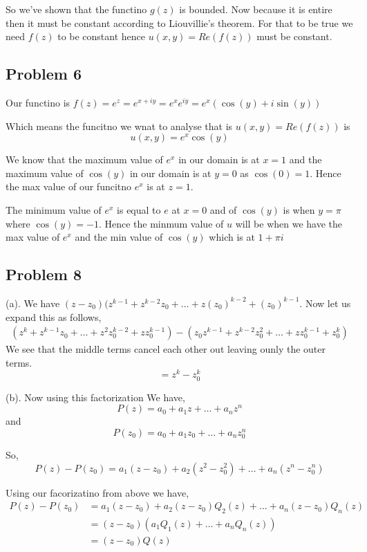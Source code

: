 \documentclass[a4paper]{report}
\begin{document}
So we've shown that the functino $g(z)$ is bounded. Now because it is entire then it must be constant according to Liouvillie's theorem. For that to be true we need $f(z)$ to be constant hence $u(x,y) = Re(f(z))$  must be constant.

\subsection*{Problem 6}


Our functino is $f(z) = e^{z} = e^{x + iy} = e^{x}e^{iy} = e^{x}(\cos(y) + i \sin(y))$ 

Which means the funcitno we wnat to analyse that is $u(x,y) = Re(f(z))$ is  
$$ u(x,y) = e^{x}\cos(y)$$

We know that the maximum value of $e^{x}$ in our domain is at $x = 1$ and the maximum value of $\cos(y)$ in our domain is at $y = 0$ as $\cos(0) = 1$. Hence the max value of our funcitno $e^{x}$ is at $z = 1$. 

The minimum value of  $e^{x}$ is equal to $e$ at  $x = 0$  and of $\cos(y)$  is when $y = \pi$ where  $\cos(y) = -1$. Hence the minmum value of  $u$ will be when  we have the max value of $e^{x}$ and the min value of $\cos(y)$ which is at $1 + \pi i$


\subsection*{Problem 8}
(a). We have $(z- z_0) (z^{k-1} + z^{k-2}z_0 + \dots + z(z_0)^{k - 2} + (z_0)^{k-1}$. Now let us expand this as follows, 
\begin{align*}
    (z^{k} + z^{k-1}z_0  + \dots + z^2z_0^{k-2} + zz_0^{k-1}) - (z_0z^{k-1} + z^{k-2}z_0^2 + \dots + zz_0^{k-1} + z_0^{k})
\end{align*}
We see that the middle terms cancel each other out leaving ounly the outer terms.
$$ = z^{k} - z_0^{k} $$ 

(b). Now using this factorization We have, 
$$ P(z) = a_0 + a_1z + \dots + a_nz^{n} $$  and 
$$ P(z_0) = a_0 + a_1z_0 + \dots + a_nz_0^{n} $$ 

So, 
$$ P(z) - P(z_0) = a_1(z - z_0) + a_2(z^2  - z_0^2) + \dots + a_n(z^{n} - z_0^{n}) $$ 

Using our facorizatino from above we have, 
\begin{align*}
    P(z) - P(z_0) &=   a_1(z - z_0) + a_2(z-z_0)Q_2(z) + \dots + a_n(z - z_0)Q_n(z) \\
                  &= (z - z_0)(a_1Q_1(z) + \dots + a_nQ_n(z)) \\
                  &=(z-z_0)Q(z) 
\end{align*}
\end{document}
